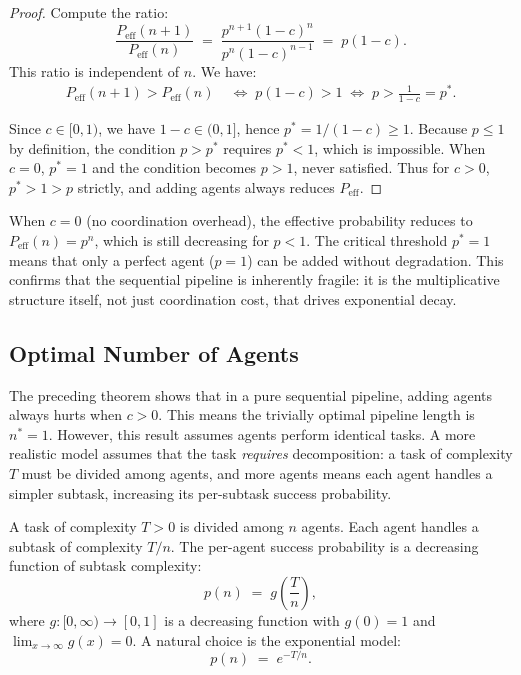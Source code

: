 \begin{proof}
Compute the ratio:
\[
  \frac{P_{\mathrm{eff}}(n+1)}{P_{\mathrm{eff}}(n)}
  \;=\; \frac{p^{n+1}(1-c)^{n}}{p^{n}(1-c)^{n-1}}
  \;=\; p(1-c).
\]
This ratio is independent of $n$. We have:
\begin{align*}
  P_{\mathrm{eff}}(n+1) > P_{\mathrm{eff}}(n)
  &\;\Longleftrightarrow\; p(1-c) > 1
  \;\Longleftrightarrow\; p > \frac{1}{1-c} = p^*.
\end{align*}

Since $c \in [0,1)$, we have $1-c \in (0,1]$, hence $p^* = 1/(1-c) \geq 1$.
Because $p \leq 1$ by definition, the condition $p > p^*$ requires $p^* < 1$,
which is impossible. When $c = 0$, $p^* = 1$ and the condition becomes $p > 1$,
never satisfied. Thus for $c > 0$, $p^* > 1 > p$ strictly, and adding agents
always reduces $P_{\mathrm{eff}}$.
\end{proof}

\begin{remark}
\label{rmk:zero-cost}
When $c = 0$ (no coordination overhead), the effective probability reduces to
$P_{\mathrm{eff}}(n) = p^n$, which is still decreasing for $p < 1$. The critical threshold
$p^* = 1$ means that only a perfect agent ($p = 1$) can be added without degradation.
This confirms that the sequential pipeline is inherently fragile: it is the
multiplicative structure itself, not just coordination cost, that drives exponential
decay.
\end{remark}

\subsection{Optimal Number of Agents}

The preceding theorem shows that in a pure sequential pipeline, adding agents always
hurts when $c > 0$. This means the trivially optimal pipeline length is $n^* = 1$.
However, this result assumes agents perform identical tasks. A more realistic model
assumes that the task \emph{requires} decomposition: a task of complexity $T$ must be
divided among agents, and more agents means each agent handles a simpler subtask,
increasing its per-subtask success probability.

\begin{definition}
\label{def:task-decomp}
A task of complexity $T > 0$ is divided among $n$ agents. Each agent handles a subtask
of complexity $T/n$. The per-agent success probability is a decreasing function of
subtask complexity:
\[
  p(n) \;=\; g\!\left(\frac{T}{n}\right),
\]
where $g : [0, \infty) \to [0,1]$ is a decreasing function with $g(0) = 1$ and
$\lim_{x \to \infty} g(x) = 0$. A natural choice is the exponential model:
\[
  p(n) \;=\; e^{-T/n}.
\]
\end{definition}

